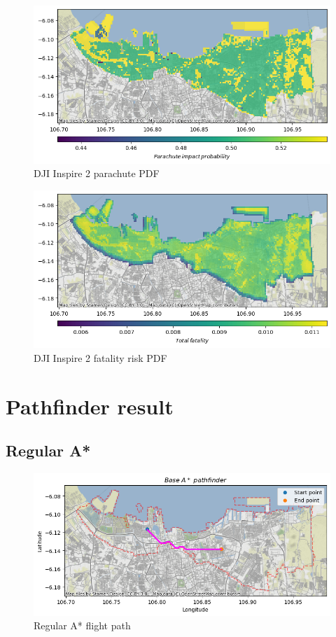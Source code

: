 \documentclass[12pt]{report}
\begin{document}
        \begin{figure}[H]
            \centering
            \includegraphics[width=\textwidth]{Plot/inspire/parachute_pdf.png}
            \caption{DJI Inspire 2 parachute PDF}
        \end{figure}
        \begin{figure}[H]
            \centering
            \includegraphics[width=\textwidth]{Plot/inspire/total_fatality_pdf.png}
            \caption{DJI Inspire 2 fatality risk PDF}
        \end{figure}

    \section{Pathfinder result}
        \label{fig:regularastar}
        \subsection{Regular A*}
        \begin{figure}[H]
            \centering
            \includegraphics[width=\textwidth]{Plot/base_a_star.png}
            \caption{Regular A* flight path}
        \end{figure}
\end{document}
